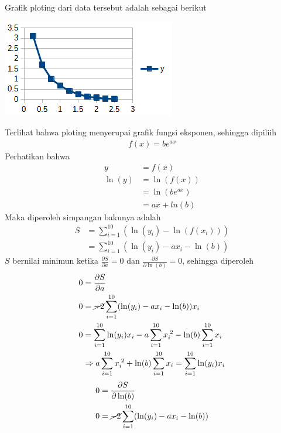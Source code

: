 \documentclass[12pt]{article}
\begin{document}
\begin{enumerate}
{        Grafik ploting dari data tersebut adalah sebagai berikut
        \begin{center}
            \includegraphics{grafik_4.png}
        \end{center}
        Terlihat bahwa ploting menyerupai grafik fungsi eksponen, sehingga dipiliih
        \begin{align*}
            f(x) = be^{ax}
        \end{align*}
        Perhatikan bahwa
        \begin{align*}
            y       & = f(x) \\
            \ln(y)  & = \ln(f(x)) \\
                    & = \ln(be^{ax}) \\
                    & = ax + ln(b)
        \end{align*}
        Maka diperoleh simpangan bakunya adalah
        \begin{align*}
            S   & = \sum_{i = 1}^{10}(\ln(y_i) - \ln(f(x_i))) \\
                & = \sum_{i = 1}^{10}(\ln(y_i) - ax_i - \ln(b))
        \end{align*}
        $ S $ bernilai minimun ketika $ \frac{\partial S}{\partial a} = 0 $ dan $ \frac{\partial S}{\partial \ln(b)} = 0 $, sehingga diperoleh
        \begin{align*}
            0   & = \frac{\partial S}{\partial a}\\
            0   & = \cancel{-2}\sum_{i = 1}^{10}(\ln(y_i) - ax_i - \ln(b))x_i\\
            0   & = \sum_{i = 1}^{10}\ln(y_i)x_i - a\sum_{i = 1}^{10}x_i^{\;2} - \ln(b)\sum_{i = 1}^{10}x_i \\
                & \Rightarrow a\sum_{i = 1}^{10}x_i^{\;2} + \ln(b)\sum_{i = 1}^{10}x_i = \sum_{i = 1}^{10}\ln(y_i)x_i
        \end{align*}
        \begin{align*}
            0   & = \frac{\partial S}{\partial \ln(b)}\\
            0   & = \cancel{-2}\sum_{i = 1}^{10}(\ln(y_i) - ax_i - \ln(b))\\

\end{align*}}
\end{enumerate}
\end{document}
